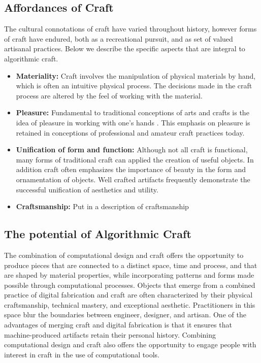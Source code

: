\documentclass{sigchi}
\begin{document}
\subsection{Affordances of Craft}
The cultural connotations of craft have varied throughout history, however forms of craft have endured, both as a recreational pursuit, and as set of valued artisanal practices. Below we describe the specific aspects that are integral to algorithmic craft.
\begin{itemize}
\item \textbf{Materiality:} Craft involves the manipulation of physical materials by hand, which is often an intuitive physical process. The decisions made in the craft process are altered by the feel of working with the material. 

\item \textbf{Pleasure:} Fundamental to traditional conceptions of arts and crafts is the idea of pleasure in working with one's hands \cite{abstracting_craft}. This emphasis on pleasure is retained in conceptions of professional and amateur craft practices today.

\item \textbf{Unification of form and function:} Although not all craft is functional, many forms of traditional craft can applied the creation of useful objects. In addition craft often emphasizes the importance of beauty in the form and ornamentation of objects. Well crafted artifacts frequently demonstrate the successful unification of aesthetics and utility.

\item \textbf{Craftsmanship:} Put in a description of craftsmanship
\end{itemize}

\subsection{The potential of Algorithmic Craft}
The combination of computational design and craft offers the opportunity to produce pieces that are connected to a distinct space, time and process, and that are shaped by material properties, while incorporating patterns and forms made possible through computational processes. Objects that emerge from a combined practice of digital fabrication and craft are often characterized by their physical craftsmanship, technical mastery, and exceptional aesthetic. Practitioners in this space blur the boundaries between engineer, designer, and artisan. One of the advantages of merging craft and digital fabrication is that it ensures that machine-produced artifacts retain their personal history. Combining computational design and craft also offers the opportunity to engage people with interest in craft in the use of computational tools.
\end{document}
